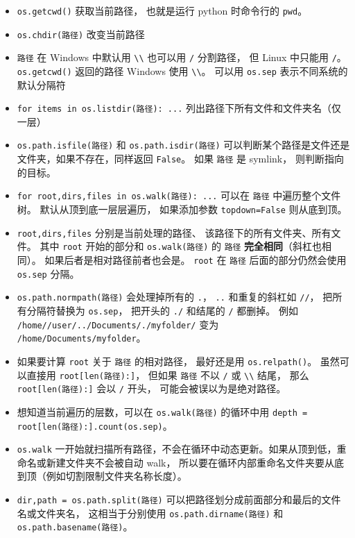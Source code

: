 
\begin{itemize}
\item \verb`os.getcwd()` 获取当前路径， 也就是运行 python 时命令行的 \verb`pwd`。
\item \verb`os.chdir(路径)` 改变当前路径 
\item \verb`路径` 在 Windows 中默认用 \verb`\\` 也可以用 \verb`/` 分割路径， 但 Linux 中只能用 \verb`/`。 \verb`os.getcwd()` 返回的路径 Windows 使用 \verb`\\`。 可以用 \verb`os.sep` 表示不同系统的默认分隔符
\item \verb`for items in os.listdir(路径): ...` 列出路径下所有文件和文件夹名（仅一层）
\item \verb`os.path.isfile(路径)` 和 \verb`os.path.isdir(路径)` 可以判断某个路径是文件还是文件夹，如果不存在，同样返回 \verb`False`。 如果 \verb`路径` 是 symlink， 则判断指向的目标。
\item \verb`for root,dirs,files in os.walk(路径): ...` 可以在 \verb`路径` 中遍历整个文件树。 默认从顶到底一层层遍历， 如果添加参数 \verb`topdown=False` 则从底到顶。
\item \verb`root,dirs,files` 分别是当前处理的路径、 该路径下的所有文件夹、所有文件。 其中 \verb`root` 开始的部分和 \verb`os.walk(路径)` 的 \verb`路径` \textbf{完全相同}（斜杠也相同）。 如果后者是相对路径前者也会是。 \verb`root` 在 \verb`路径` 后面的部分仍然会使用 \verb`os.sep` 分隔。
\item \verb`os.path.normpath(路径)` 会处理掉所有的 \verb`.`， \verb`..` 和重复的斜杠如 \verb`//`， 把所有分隔符替换为 \verb`os.sep`， 把开头的 \verb`./` 和结尾的 \verb`/` 都删掉。 例如 \verb`/home//user/../Documents/./myfolder/` 变为 \verb`/home/Documents/myfolder`。
\item 如果要计算 \verb`root` 关于 \verb`路径` 的相对路径， 最好还是用 \verb`os.relpath()`。 虽然可以直接用 \verb`root[len(路径):]`， 但如果 \verb`路径` 不以 \verb`/` 或 \verb`\\` 结尾， 那么 \verb`root[len(路径):]` 会以 \verb`/` 开头， 可能会被误以为是绝对路径。
\item 想知道当前遍历的层数，可以在 \verb`os.walk(路径)` 的循环中用 \verb`depth = root[len(路径):].count(os.sep)`。
\item \verb`os.walk` 一开始就扫描所有路径，不会在循环中动态更新。如果从顶到低，重命名或新建文件夹不会被自动 walk， 所以要在循环内部重命名文件夹要从底到顶（例如切割限制文件夹名称长度）。
\item \verb`dir,path = os.path.split(路径)` 可以把路径划分成前面部分和最后的文件名或文件夹名， 这相当于分别使用 \verb`os.path.dirname(路径)` 和 \verb`os.path.basename(路径)`。

\end{itemize}
